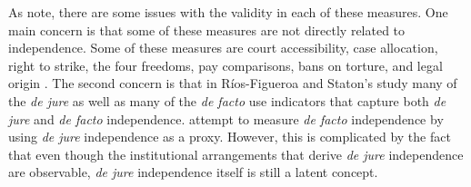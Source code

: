 \documentclass[12pt]{article}
\begin{document}
As \citet{Rios2014} note, there are some issues with the validity in each of these measures.  One main concern is that some of these measures are not directly related to independence.  Some of these measures are court accessibility, case allocation, right to strike, the four freedoms, pay comparisons, bans on torture, and legal origin \citep{Feld2003,Keith2002a,Laporta2004,Rios2014}.  The second concern is that in R\'{i}os-Figueroa and Staton's study many of the \textit{de jure} as well as many of the \textit{de facto} use indicators that capture both \textit{de jure} and \textit{de facto} independence.  \citealt{Laporta2004} attempt to measure \textit{de facto} independence by using \textit{de jure} independence as a proxy.  However, this is complicated by the fact that even though the institutional arrangements that derive \textit{de jure} independence are observable, \textit{de jure} independence itself is still a latent concept. 
\end{document}
